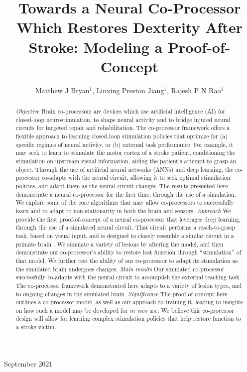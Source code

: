 \documentclass[12pt]{iopart}
\begin{document}
\title[Modeling a Neural Co-Processor]
{Towards a Neural Co-Processor Which Restores Dexterity After Stroke: Modeling a Proof-of-Concept}

\author{Matthew J Bryan$^{1}$, Linxing Preston Jiang$^{1}$, Rajesh P N Rao$^{1}$}

\address{$^{1}$ Neural Systems Laboratory, Department of Computer
Science and Engineering, University of Washington, Box 352350,
Seattle, WA 98105, USA}

\vspace{10pt}
\begin{indented}
\item[]September 2021
\end{indented}

\begin{abstract}
\textit{Objective} Brain co-processors \cite{rao.coproc} are devices which use artificial
intelligence (AI) for closed-loop neurostimulation, to shape neural activity and to bridge
injured neural circuits for targeted repair and rehabilitation. The co-processor framework
offers a flexible approach to learning closed-loop stimulation policies that optimize for
(a) specific regimes of neural activity, or (b) external task performance.
For example, it may seek to learn to stimulate the motor cortex of a stroke patient,
conditioning the stimulation on upstream visual information, aiding the patient's
attempt to grasp an object. Through the use of artificial neural
networks (ANNs) and deep learning, the co-processor co-adapts with the
neural circuit, allowing it to seek optimal stimulation policies, and adapt them
as the neural circuit changes. The results presented here demonstrate a
neural co-processor for the first time, through the use of a simulation. We
explore some of the core algorithms that may allow co-processors to successfully
learn and to adapt to non-stationarity in both the brain and sensors.
\textit{Approach} We provide the first proof-of-concept of a neural co-processor that
leverages deep learning, through the use of a simulated neural circuit.
That circuit performs a reach-to-grasp task, based on visual input, and is designed to
closely resemble a similar circuit in a primate brain \cite{michaels.mrnn}. We simulate
a variety of lesions by altering the model, and then demonstrate our co-processor's ability
to restore lost function through ``stimulation'' of that model. We further test the
ability of our co-processor to adapt its stimulation as the simulated brain undergoes changes.
\textit{Main results} Our simulated co-processor successfully co-adapts with the neural
circuit to accomplish the external reaching task. The co-processor framework
demonstrated here adapts to a variety of lesion types, and to ongoing changes in the
simulated brain.
\textit{Significance} The proof-of-concept here outlines a co-processor model, as well
as our approach to training it, leading to insights on how such a model may be
developed for \textit{in vivo} use. We believe this co-processor design will allow for
learning complex stimulation policies that help restore function to a stroke victim.
\end{abstract}
\end{document}
